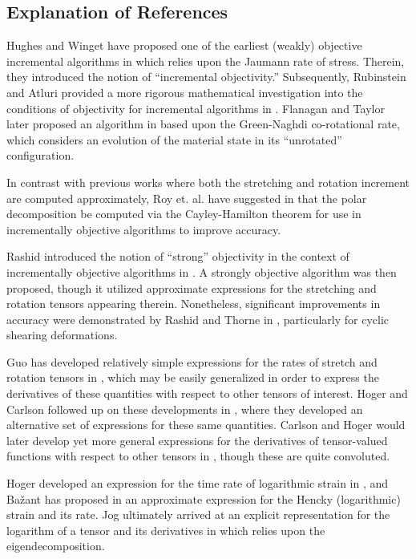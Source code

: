 \subsection{Explanation of References}
Hughes and Winget have proposed one of the earliest (weakly) objective incremental algorithms in \cite{hughes1980} which relies upon the Jaumann rate of stress. Therein, they introduced the notion of ``incremental objectivity.'' Subsequently, Rubinstein and Atluri provided a more rigorous mathematical investigation into the conditions of objectivity for incremental algorithms in \cite{rubinstein1983}. Flanagan and Taylor later proposed an algorithm in \cite{flanagan1987} based upon the Green-Naghdi co-rotational rate, which considers an evolution of the material state in its ``unrotated'' configuration.

In contrast with previous works where both the stretching and rotation increment are computed approximately, Roy et. al. have suggested in \cite{roy1992} that the polar decomposition be computed via the Cayley-Hamilton theorem for use in incrementally objective algorithms to improve accuracy.

Rashid introduced the notion of ``strong'' objectivity in the context of incrementally objective algorithms in \cite{rashid1993}. A strongly objective algorithm was then proposed, though it utilized approximate expressions for the stretching and rotation tensors appearing therein. Nonetheless, significant improvements in accuracy were demonstrated by Rashid and Thorne in \cite{rashid1996}, particularly for cyclic shearing deformations.

Guo has developed relatively simple expressions for the rates of stretch and rotation tensors in \cite{guo1984}, which may be easily generalized in order to express the derivatives of these quantities with respect to other tensors of interest. Hoger and Carlson followed up on these developments in \cite{hoger1984}, where they developed an alternative set of expressions for these same quantities. Carlson and Hoger would later develop yet more general expressions for the derivatives of tensor-valued functions with respect to other tensors in \cite{carlson1986}, though these are quite convoluted.

Hoger developed an expression for the time rate of logarithmic strain in \cite{hoger1986}, and Ba\v{z}ant has proposed in \cite{bazant1998} an approximate expression for the Hencky (logarithmic) strain and its rate. Jog ultimately arrived at an explicit representation for the logarithm of a tensor and its derivatives in \cite{jog2008} which relies upon the eigendecomposition.

